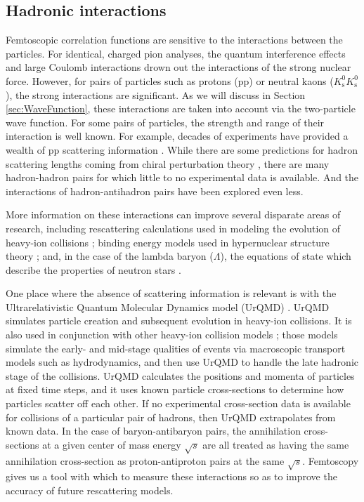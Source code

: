 \subsection{Hadronic interactions}
\label{sec:HadronicInteractions}



Femtoscopic correlation functions are sensitive to the interactions between the particles.
For identical, charged pion analyses, the quantum interference effects and large Coulomb interactions drown out the interactions of the strong nuclear force.
However, for pairs of particles such as protons (pp) or neutral kaons ($K^0_\mathrm{s}K^0_\mathrm{s}$), the strong interactions are significant.
As we will discuss in Section \ref{sec:WaveFunction}, these interactions are taken into account via the two-particle wave function.
For some pairs of particles, the strength and range of their interaction is well known. For example, decades of experiments have provided a wealth of pp scattering information \cite{Perez:2013jpa}.
While there are some predictions for hadron scattering lengths coming from chiral perturbation theory \cite{Mai:2009ce}, there are many hadron-hadron pairs for which little to no experimental data is available. And the interactions of hadron-antihadron pairs have been explored even less.

More information on these interactions can improve several disparate areas of research, including rescattering calculations used in modeling the evolution of heavy-ion collisions \cite{Bleicher:1999xi}; binding energy models used in hypernuclear structure theory \cite{Hiyama:2002yj,Filikhin:2002wm}; and, in the case of the lambda baryon ($\Lambda$), the equations of state which describe the properties of neutron stars \cite{SchaffnerBielich:2008kb,Wang:2010gr}.

One place where the absence of scattering information is relevant is with the Ultrarelativistic Quantum Molecular Dynamics model (UrQMD) \cite{Bleicher:1999xi}. UrQMD simulates particle creation and subsequent evolution in heavy-ion collisions.
It is also used in conjunction with other heavy-ion collision models \cite{Bass:2000ib,Ryu:2012at,Song:2013qma}; those models simulate the early- and mid-stage qualities of events via macroscopic transport models such as hydrodynamics, and then use UrQMD to handle the late hadronic stage of the collisions.
UrQMD calculates the positions and momenta of particles at fixed time steps, and it uses known particle cross-sections to determine how particles scatter off each other.
If no experimental cross-section data is available for collisions of a particular pair of hadrons, then UrQMD extrapolates from known data.
In the case of baryon-antibaryon pairs, the annihilation cross-sections at a given center of mass energy $\sqrt{s}$ are all treated as having the same annihilation cross-section as proton-antiproton pairs at the same $\sqrt{s}$.
Femtoscopy gives us a tool with which to measure these interactions so as to improve the accuracy of future rescattering models.

